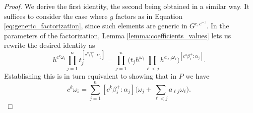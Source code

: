 \documentclass[12pt]{amsart}
\newcommand{\RR}{\mathbb{R}}
\theoremstyle{remark}
\numberwithin{equation}{section}
\begin{document}
\begin{proof}
  We derive the first identity, the second being obtained in a similar way. It suffices to consider the case where $g$ factors as in Equation \ref{eq:generic_factorization}, since such elements are generic in $G^{c,c^{-1}}$.  
  In the parameters of the factorization, Lemma \ref{lemma:coefficients_values} lets us rewrite the desired identity as
\[
h^{c^k\omega_i}\prod_{j=1}^n t_{j}^{[c^k\beta_i^+:\alpha_j]} = \prod_{j=1}^n\Big( 
    t_j
    h^{\omega_j}\prod_{ \ell <j}h^{a_{\ell j}\omega_ \ell }\Big)^{[c^k\beta_i^+:\alpha_j]}.
\]
Establishing this is in turn equivalent to showing that in $P$ we have
  \begin{equation}\label{eq:coxeter_identity_omega}
    c^k\omega_i 
    =
    \sum_{j=1}^n
    [c^k\beta_i^+:\alpha_j]
    \Big(
    \omega_j+
    \sum_{\ell<j} a_{\ell j}\omega_\ell
    \Big).
  \end{equation}



\end{proof}
\end{document}
